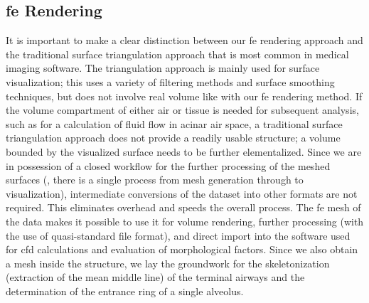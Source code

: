 \subsection{\acs{fe} \threed Rendering}
It is important to make a clear distinction between our \ac{fe} \threed rendering approach and the traditional surface triangulation approach that is most common in medical imaging software. The triangulation approach is mainly used for surface visualization; this uses a variety of filtering methods and surface smoothing techniques, but does not involve real volume like with our \ac{fe} \threed rendering method. If the volume compartment of either air or tissue is needed for subsequent analysis, such as for a calculation of fluid flow in acinar air space, a traditional surface triangulation approach does not provide a readily usable \threed structure; a volume bounded by the visualized surface needs to be further elementalized. Since we are in possession of a closed workflow for the further processing of the meshed surfaces (\ie, there is a single process from mesh generation through to visualization), intermediate conversions of the dataset into other formats are not required. This eliminates overhead and speeds the overall process. The \ac{fe} mesh of the data makes it possible to use it for volume rendering, further processing (with the use of quasi-standard  file format), and direct import into the software used for \ac{cfd} calculations and evaluation of morphological factors. Since we also obtain a mesh inside the structure, we lay the groundwork for the skeletonization (extraction of the mean middle line) of the terminal airways and the determination of the entrance ring of a single alveolus.

